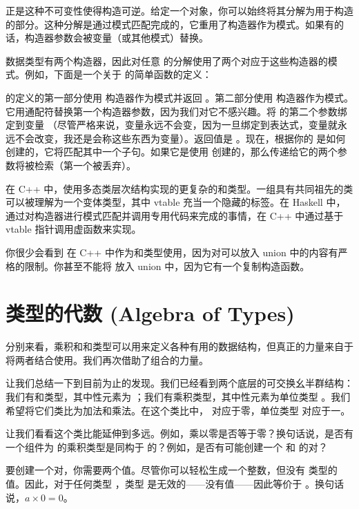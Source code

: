 正是这种不可变性使得构造可逆。给定一个对象，你可以始终将其分解为用于构造的部分。这种分解是通过模式匹配完成的，它重用了构造器作为模式。如果有的话，构造器参数会被变量（或其他模式）替换。

 数据类型有两个构造器，因此对任意  的分解使用了两个对应于这些构造器的模式。例如，下面是一个关于  的简单函数的定义：

 的定义的第一部分使用  构造器作为模式并返回 。第二部分使用  构造器作为模式。它用通配符替换第一个构造器参数，因为我们对它不感兴趣。将  的第二个参数绑定到变量 （尽管严格来说，变量永远不会变，因为一旦绑定到表达式，变量就永远不会改变，我还是会称这些东西为变量）。返回值是 。现在，根据你的  是如何创建的，它将匹配其中一个子句。如果它是使用  创建的，那么传递给它的两个参数将被检索（第一个被丢弃）。

在 C++ 中，使用多态类层次结构实现的更复杂的和类型。一组具有共同祖先的类可以被理解为一个变体类型，其中 vtable 充当一个隐藏的标签。在 Haskell 中，通过对构造器进行模式匹配并调用专用代码来完成的事情，在 C++ 中通过基于 vtable 指针调用虚函数来实现。

你很少会看到  在 C++ 中作为和类型使用，因为对可以放入 union 中的内容有严格的限制。你甚至不能将  放入 union 中，因为它有一个复制构造函数。

\section{类型的代数 (Algebra of Types)}

分别来看，乘积和和类型可以用来定义各种有用的数据结构，但真正的力量来自于将两者结合使用。我们再次借助了组合的力量。

让我们总结一下到目前为止的发现。我们已经看到两个底层的可交换幺半群结构：我们有和类型，其中性元素为 ；我们有乘积类型，其中性元素为单位类型 \code{()}。我们希望将它们类比为加法和乘法。在这个类比中， 对应于零，单位类型 \code{()} 对应于一。

让我们看看这个类比能延伸到多远。例如，乘以零是否等于零？换句话说，是否有一个组件为  的乘积类型是同构于  的？例如，是否有可能创建一个  和  的对？

要创建一个对，你需要两个值。尽管你可以轻松生成一个整数，但没有  类型的值。因此，对于任何类型 ，类型  是无效的——没有值——因此等价于 。换句话说，$a \times 0 = 0$。

